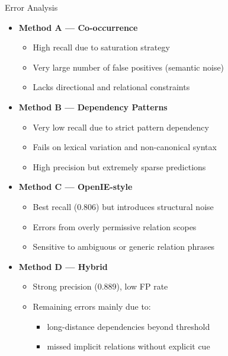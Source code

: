 \documentclass[aspectratio=169,11pt]{beamer}
\begin{document}
\begin{frame}{Error Analysis}
\small

\begin{itemize}
  \item \textbf{Method A --- Co-occurrence}
  \begin{itemize}
    \item High recall due to saturation strategy
    \item Very large number of false positives (semantic noise)
    \item Lacks directional and relational constraints
  \end{itemize}

  \item \textbf{Method B --- Dependency Patterns}
  \begin{itemize}
    \item Very low recall due to strict pattern dependency
    \item Fails on lexical variation and non-canonical syntax
    \item High precision but extremely sparse predictions
  \end{itemize}

  \item \textbf{Method C --- OpenIE-style}
  \begin{itemize}
    \item Best recall (0.806) but introduces structural noise
    \item Errors from overly permissive relation scopes
    \item Sensitive to ambiguous or generic relation phrases
  \end{itemize}

  \item \textbf{Method D --- Hybrid}
  \begin{itemize}
    \item Strong precision (0.889), low FP rate
    \item Remaining errors mainly due to:
    \begin{itemize}
      \item long-distance dependencies beyond threshold
      \item missed implicit relations without explicit cue
    \end{itemize}
  \end{itemize}
\end{itemize}

\end{frame}
\end{document}
